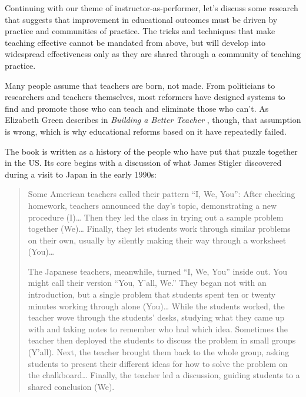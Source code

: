 
Continuing with our theme of instructor-as-performer, let's discuss some
research that suggests that improvement in educational outcomes must be
driven by practice and communities of practice. The tricks and
techniques that make teaching effective cannot be mandated from above,
but will develop into widespread effectiveness only as they are shared
through a community of teaching practice.


Many people assume that teachers are born, not made. From politicians to
researchers and teachers themselves, most reformers have designed
systems to find and promote those who can teach and eliminate those who
can't. As Elizabeth Green describes in
\emph{Building a Better Teacher} \cite{bib:green-babt}, though,
that assumption is wrong, which is why
educational reforms based on it have repeatedly failed.

The book is written as a history of the people who have put that puzzle
together in the US. Its core begins with a discussion of what James
Stigler discovered during a visit to Japan in the early 1990s:

\begin{quote}
Some American teachers called their pattern ``I, We, You'': After
checking homework, teachers announced the day's topic, demonstrating a
new procedure (I)\ldots{} Then they led the class in trying out a sample
problem together (We)\ldots{} Finally, they let students work through
similar problems on their own, usually by silently making their way
through a worksheet (You)\ldots{}

The Japanese teachers, meanwhile, turned ``I, We, You'' inside out. You
might call their version ``You, Y'all, We.'' They began not with an
introduction, but a single problem that students spent ten or twenty
minutes working through alone (You)\ldots{} While the students worked,
the teacher wove through the students' desks, studying what they came up
with and taking notes to remember who had which idea. Sometimes the
teacher then deployed the students to discuss the problem in small
groups (Y'all). Next, the teacher brought them back to the whole group,
asking students to present their different ideas for how to solve the
problem on the chalkboard\ldots{} Finally, the teacher led a discussion,
guiding students to a shared conclusion (We).
\end{quote}


